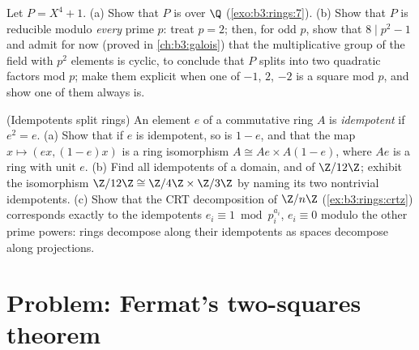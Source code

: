 \begin{exercise}[$\star\star\star$]\label{exo:b3:rings:11}
Let $P = X^4 + 1$.
(a) Show that $P$ is  over $\Q$
(\cref{exo:b3:rings:7}).
(b) Show that $P$ is reducible modulo \emph{every} prime $p$:
treat $p = 2$; then, for odd $p$, show that $8 \mid p^2 - 1$ and
admit for now (proved in \cref{ch:b3:galois}) that the
multiplicative group of the field with $p^2$ elements is cyclic,
to conclude that $P$ splits into two quadratic factors mod $p$;
make them explicit when one of $-1$, $2$, $-2$ is a square mod
$p$, and show one of them always is.
\end{exercise}

\begin{exercise}[$\star\star$]\label{exo:b3:rings:12}
(Idempotents split rings) An element $e$ of a commutative ring
$A$ is \emph{idempotent} if $e^2 = e$.
(a) Show that if $e$ is idempotent, so is $1 - e$, and that
the map $x \mapsto (ex, (1-e)x)$ is a ring isomorphism $A
\cong Ae \times A(1-e)$, where $Ae$ is a ring with unit $e$.
(b) Find all idempotents of a domain, and of $\Z/12\Z$;
exhibit the isomorphism $\Z/12\Z \cong \Z/4\Z \times \Z/3\Z$
by naming its two nontrivial idempotents.
(c) Show that the CRT decomposition of $\Z/n\Z$
(\cref{ex:b3:rings:crtz}) corresponds exactly to the
idempotents $e_i \equiv 1 \bmod p_i^{a_i}$, $e_i \equiv 0$
modulo the other prime powers: rings decompose along their
idempotents as spaces decompose along projections.
\end{exercise}

\section{Problem: Fermat's two-squares theorem}

